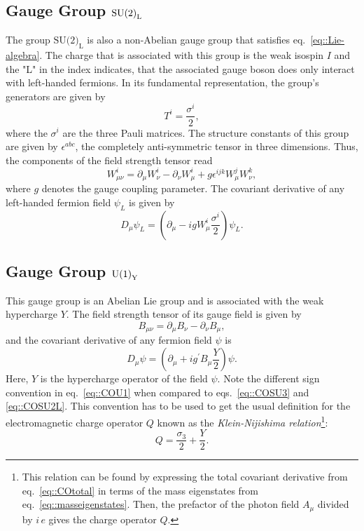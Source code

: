 \documentclass[a4paper,12pt]{book}
\begin{document}
\subsection{Gauge Group $\normalfont \text{SU(2)}_{ \text{L}}$}
The group $\text{SU(2)}_{ \text{L}}$ is also a non-Abelian gauge group that satisfies eq.\ \eqref{eq::Lie-algebra}. The charge that is associated with this group is the weak isospin $I$ and the "L" in the index indicates, that the associated gauge boson does only interact with left-handed fermions. In its fundamental representation, the group's generators are given by
\begin{equation}
T^i = \frac{\sigma^i}{2},
\end{equation}
where the $\sigma^i$ are the three Pauli matrices. The structure constants of this group are given by $\epsilon^{abc}$, the completely anti-symmetric tensor in three dimensions. Thus, the components of the field strength tensor read
\begin{equation}
W_{\mu\nu}^i = \partial_\mu W_\nu^i - \partial_\nu W_\mu^i + g \epsilon^{ijk} W_\mu^j W_\nu^k,
\end{equation} 
where $g$ denotes the gauge coupling parameter. The covariant derivative of any left-handed fermion field $\psi_L$ is given by
\begin{equation}
\label{eq::COSU2L}
D_\mu \psi_L = \left(\partial_\mu - i gW_\mu^i \frac{\sigma^i}{2} \right)\psi_L.
\end{equation}
\subsection{Gauge Group $\normalfont \text{U(1)}_{ \text{Y}}$}
This gauge group is an Abelian Lie group and is associated with the weak hypercharge $Y$. The field strength tensor of its gauge field is given by
\begin{equation}
B_{\mu\nu}= \partial_\mu B_\nu - \partial_\nu B_\mu,
\end{equation}
and the covariant derivative of any fermion field $\psi$ is 
\begin{equation}
\label{eq::COU1}
D_\mu  \psi = \left(\partial_\mu + i g^\prime B_\mu \frac{Y}{2}\right)\psi.
\end{equation}
Here, $Y$ is the hypercharge operator of the field $\psi$. Note the different sign convention in eq.\ \eqref{eq::COU1} when compared to eqs.\ \eqref{eq::COSU3} and \eqref{eq::COSU2L}. This convention has to be used to get the usual definition for the electromagnetic charge operator $Q$ known as the \textit{Klein-Nijishima relation}\footnote{This relation can be found by expressing the total covariant derivative from eq.\ \eqref{eq::COtotal} in terms of the mass eigenstates from eq.\ \eqref{eq::masseigenstates}. Then, the prefactor of the photon field $A_\mu$ divided by $i\,e$ gives the charge operator $Q$.}: 
\begin{equation}
\label{eq::klein-nijishima}
Q=\frac{\sigma_3}{2}+\frac{Y}{2}.
\end{equation}
\end{document}
